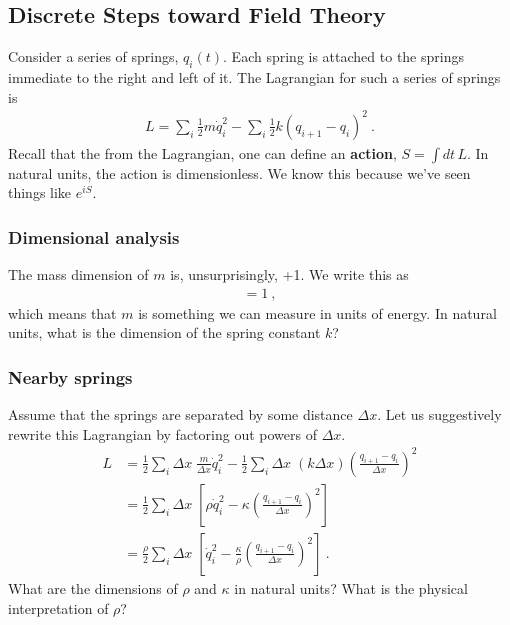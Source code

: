 \documentclass[12pt]{article}
\begin{document}
\subsection{Discrete Steps toward Field Theory}

Consider a series of springs, $q_i(t)$. Each spring is attached to the springs immediate to the right and left of it. The Lagrangian for such a series of springs is
\begin{align}
	L  = \sum_i\frac 12 m \dot q_i^2 - \sum_i \frac 12 k(q_{i+1} - q_i)^2 \ .
\end{align}
Recall that the from the Lagrangian, one can define an \textbf{action}, $S = \int dt \, L$. In natural units, the action is dimensionless. We know this because we've seen things like $e^{iS}$. 

\subsubsection{Dimensional analysis}

The mass dimension of $m$ is, unsurprisingly, +1. We write this as 
\begin{align}
	[m] = 1 \ ,
\end{align}
which means that $m$ is something we can measure in units of energy. In natural units, what is the dimension of the spring constant $k$?

\subsubsection{Nearby springs}

Assume that the springs are separated by some distance $\Delta x$. Let us suggestively rewrite this Lagrangian by factoring out powers of $\Delta x$.
\begin{align}
	L  &= 
	\frac 12 \sum_i \Delta x \;   \frac{m}{\Delta x} \dot q_i^2 
	- \frac 12 \sum_i \Delta x \;   \left(k\Delta x\right) \left(\frac{q_{i+1} - q_i}{\Delta x}\right)^2 
	\\
	&= 
	\frac 12 \sum_i \Delta x \;   
	\left[
	\rho \dot q_i^2 
	- 
	\kappa \left(\frac{q_{i+1} - q_i}{\Delta x}\right)^2 
	\right]
	\\
	&= 
	\frac{\rho}{2} \sum_i \Delta x \;   
	\left[
	\dot q_i^2 
	- 
	\frac{\kappa}{\rho} \left(\frac{q_{i+1} - q_i}{\Delta x}\right)^2 
	\right]
	\label{eq:spring}
	\ .
\end{align}
What are the dimensions of $\rho$ and $\kappa$ in natural units? What is the physical interpretation of $\rho$?
\end{document}
